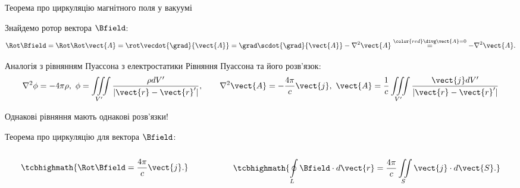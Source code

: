 \documentclass{beamer}
\begin{document}
\begin{frame}{Теорема про циркуляцію магнітного поля у вакуумі}{}
	\begin{block}{}
		Знайдемо ротор вектора $\Bfield$:
		\begin{equation*}
			\Rot\Bfield = \Rot\Rot\vect{A} = \rot\vecdot{\grad}{\vect{A}}  = \grad\scdot{\grad}{\vect{A}} - \nabla^2\vect{A}
			\stackrel{\color{red}\divg\vect{A}
				= 0}{=}  - \nabla^2\vect{A}.
		\end{equation*}
	\end{block}
	\begin{exampleblock}{\scriptsize Аналогія з рівнянням Пуассона з електростатики}\scriptsize
		Рівняння Пуассона та його розв'язок:
		\begin{equation*}
			\nabla^2\phi= -4\pi\rho,\ \phi = \iiint\limits_{V'} \frac{\rho dV'}{|\vect{r} - \vect{r}'|}, \qquad
			\nabla^2 \vect{A} = -\frac{4\pi}{c} \vect{j},\
			\vect{A} = \frac1c\iiint\limits_{V'} \frac{\vect{j} dV'}{|\vect{r} - \vect{r}'|}
		\end{equation*}
		\begin{center}
			\alert{Однакові рівняння мають однакові розв'язки!}
		\end{center}
	\end{exampleblock}
	Теорема про циркуляцію для вектора $\Bfield$:
	\begin{columns}\centering
		\begin{column}{0.5\linewidth}
			\begin{equation*}
				\tcbhighmath{\Rot\Bfield = \frac{4\pi}c\vect{j}.}
			\end{equation*}
		\end{column}
		\begin{column}{0.5\linewidth}
			\begin{equation*}
				\tcbhighmath{\oint\limits_{L}\Bfield\cdot d\vect{r} = \frac{4\pi}c \iint\limits_{S} \vect{j}\cdot d\vect{S}.}
			\end{equation*}
		\end{column}
	\end{columns}
\end{frame}
\end{document}
